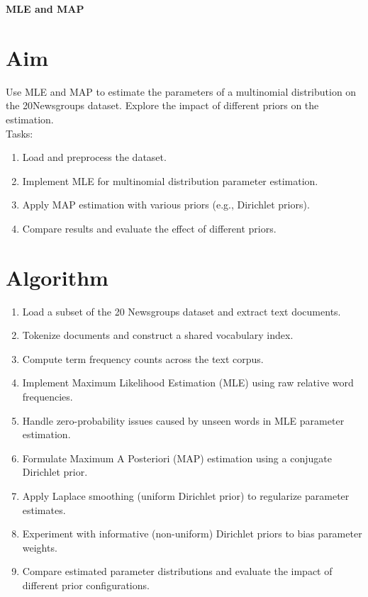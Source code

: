 \documentclass[12pt, a4paper]{report}
\begin{document}
\label{exp:7}
\begin{center}
	{\bfseries \Huge MLE and MAP}	
\end{center}

\section*{Aim} 
Use MLE and MAP to estimate the parameters of a multinomial distribution on the 20Newsgroups dataset. Explore
the impact of different priors on the estimation. \\
Tasks:
\begin{enumerate}[\quad -]
	\itemsep 0em 
	
	\item Load and preprocess the dataset.
	\item Implement MLE for multinomial distribution parameter estimation.
	\item Apply MAP estimation with various priors (e.g., Dirichlet priors).
	\item Compare results and evaluate the effect of different priors.
\end{enumerate}

\section*{Algorithm} 
\begin{enumerate}
	\item Load a subset of the 20 Newsgroups dataset and extract text documents.
	\item Tokenize documents and construct a shared vocabulary index.
	\item Compute term frequency counts across the text corpus.
	\item Implement Maximum Likelihood Estimation (MLE) using raw relative word frequencies.
	\item Handle zero-probability issues caused by unseen words in MLE parameter estimation.
	\item Formulate Maximum A Posteriori (MAP) estimation using a conjugate Dirichlet prior.
	\item Apply Laplace smoothing (uniform Dirichlet prior) to regularize parameter estimates.
	\item Experiment with informative (non-uniform) Dirichlet priors to bias parameter weights.
	\item Compare estimated parameter distributions and evaluate the impact of different prior configurations.
\end{enumerate}
\end{document}
